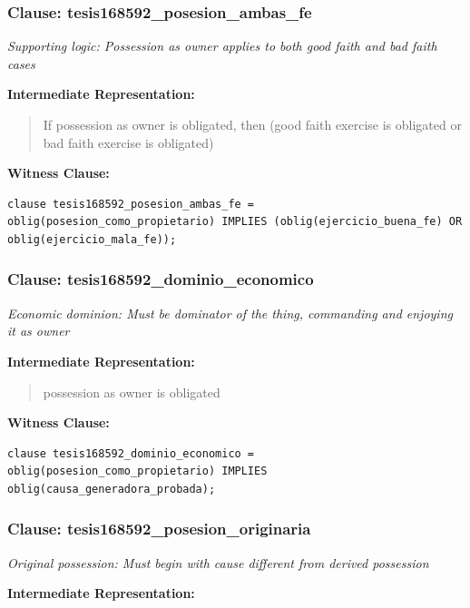 \documentclass[11pt,a4paper]{article}
\begin{document}
\subsubsection{Clause: tesis168592\_posesion\_ambas\_fe}

\textit{Supporting logic: Possession as owner applies to both good faith and bad faith cases}

\textbf{Intermediate Representation:}

\begin{quote}
If possession as owner is obligated, then (good faith exercise is obligated or bad faith exercise is obligated)
\end{quote}

\textbf{Witness Clause:}

\begin{lstlisting}[style=witnessstyle, language=Witness]
clause tesis168592_posesion_ambas_fe = oblig(posesion_como_propietario) IMPLIES (oblig(ejercicio_buena_fe) OR oblig(ejercicio_mala_fe));
\end{lstlisting}

\subsubsection{Clause: tesis168592\_dominio\_economico}

\textit{Economic dominion: Must be dominator of the thing, commanding and enjoying it as owner}

\textbf{Intermediate Representation:}

\begin{quote}
possession as owner is obligated
\end{quote}

\textbf{Witness Clause:}

\begin{lstlisting}[style=witnessstyle, language=Witness]
clause tesis168592_dominio_economico = oblig(posesion_como_propietario) IMPLIES oblig(causa_generadora_probada);
\end{lstlisting}

\subsubsection{Clause: tesis168592\_posesion\_originaria}

\textit{Original possession: Must begin with cause different from derived possession}

\textbf{Intermediate Representation:}
\end{document}
